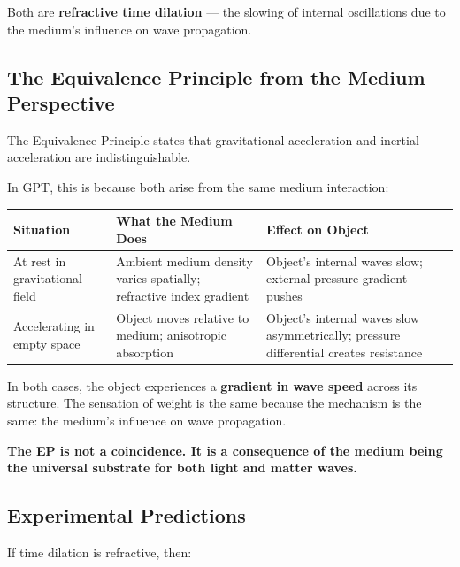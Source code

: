 \documentclass[12pt, a4paper]{article}
\begin{document}
Both are \textbf{refractive time dilation} — the slowing of internal oscillations due to the medium's influence on wave propagation.

\subsection{The Equivalence Principle from the Medium Perspective}
\label{subsec:ep_medium_perspective}

The Equivalence Principle states that gravitational acceleration and inertial acceleration are indistinguishable.

In GPT, this is because both arise from the same medium interaction:

\begin{center}
\begin{tabular}{|p{4cm}|p{5cm}|p{5cm}|}
\hline
\textbf{Situation} & \textbf{What the Medium Does} & \textbf{Effect on Object} \\
\hline
At rest in gravitational field & Ambient medium density varies spatially; refractive index gradient & Object's internal waves slow; external pressure gradient pushes \\
\hline
Accelerating in empty space & Object moves relative to medium; anisotropic absorption & Object's internal waves slow asymmetrically; pressure differential creates resistance \\
\hline
\end{tabular}
\end{center}

In both cases, the object experiences a \textbf{gradient in wave speed} across its structure. The sensation of weight is the same because the mechanism is the same: the medium's influence on wave propagation.

\textbf{The EP is not a coincidence. It is a consequence of the medium being the universal substrate for both light and matter waves.}

\subsection{Experimental Predictions}
\label{subsec:time_dilation_predictions}

If time dilation is refractive, then:
\end{document}
